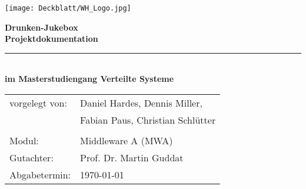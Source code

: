 \thispagestyle{plain}
\begin{titlepage}

\begin{center}

\texttt{[image: Deckblatt/WH\_Logo.jpg]}

\vspace{2cm}

\Huge{\textbf{Drunken-Jukebox}}\\[1.5ex]
\Large{\textbf{Projektdokumentation}}
\rule{\textwidth}{0.4pt}\\[3.0ex]

\large{\textbf{im Masterstudiengang Verteilte Systeme}}\\[3.0ex]

\normalsize
\begin{tabular}{ll}\\
	vorgelegt von: 
	& \quad Daniel Hardes, Dennis Miller, \\[1.2ex]
	& \quad Fabian Paus, Christian Schlütter\\[1.2ex]
	& \quad \\[1.2ex]
	Modul:  & \quad Middleware A (MWA) \\[1.2ex]
	Gutachter:  & \quad Prof. Dr. Martin Guddat \\[1.2ex]
	Abgabetermin:  & \quad \today\\[1.2ex]
\end{tabular}

\end{center}

\end{titlepage}
